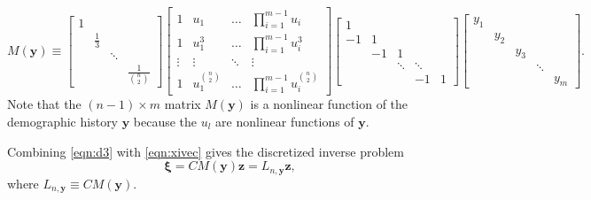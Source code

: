 \begin{equation}
\label{eqn:M}
M(\boldsymbol y) \equiv
\begin{bmatrix}
1 &             &        &                       \\
  & \frac{1}{3} &        &                       \\
  &             & \ddots &                       \\
  &             &        & \frac{1}{\binom{n}{2}}
\end{bmatrix}
\begin{bmatrix}
1       & u_1                & \hdots & \prod_{i=1}^{m-1}u_i               \\
1       & u_1^3              & \hdots & \prod_{i=1}^{m-1}u_i^3             \\
\vdots  & \vdots             & \ddots & \vdots                                \\
1       & u_1^{\binom{n}{2}} & \hdots & \prod_{i=1}^{m-1}u_i^{\binom{n}{2}}
\end{bmatrix}
\begin{bmatrix}
1  &      &        &             &       \\
-1 & 1  &        &             &       \\
     & -1 & 1    &             &       \\
     &      & \ddots & \ddots      &       \\
     &      &        & -1 & 1
\end{bmatrix}
\begin{bmatrix}
y_1 &     &      &             &       \\
    & y_2 &      &             &       \\
     &     & y_3 &             &       \\
     &      &    & \ddots      &       \\
     &      &        &  & y_m
\end{bmatrix}.
\end{equation}
Note that the $(n-1)\times m$ matrix $M(\boldsymbol y)$ is a nonlinear function of the demographic history $\boldsymbol y$ because the $u_l$ are nonlinear functions of $\boldsymbol y$.

Combining \ref{eqn:d3} with \ref{eqn:xivec} gives the discretized inverse problem
\begin{equation}
\boldsymbol\xi = C M(\boldsymbol y) \boldsymbol z = L_{n, \boldsymbol y} \boldsymbol z,
\end{equation}
where $L_{n, \boldsymbol y}\equiv C M(\boldsymbol y)$.
